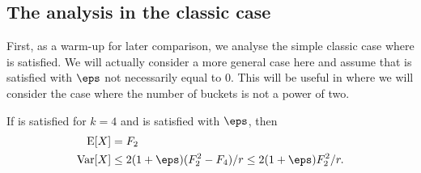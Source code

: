 \subsection{The analysis in the classic case}
First, as a warm-up for later comparison, we analyse the simple classic
case where  is satisfied. We will actually consider
a more general case here and assume that  is satisfied
with $\eps$ not necessarily equal to $0$. This will be useful in
 where we will consider the case
where the number of buckets is not a power of two.
\begin{lemma}
    If  is satisfied for $k = 4$ and 
    is satisfied with $\eps$, then
    \begin{align}
        \E[X] &= F_2 \\
        \Var[X] &\le 2(1 + \eps)(F_2^2 - F_4)/r \le 2(1 + \eps)F_2^2/r .
    \end{align}
\end{lemma}
